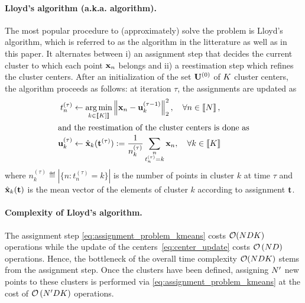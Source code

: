 \paragraph{Lloyd's algorithm (a.k.a. \kmeans algorithm).} The most popular procedure to (approximately) 
solve the \kmeans problem is Lloyd's algorithm, which is referred to as the \kmeans algorithm in the litterature as well as in this paper.
It alternates between
i) an assignment step that decides the current cluster to which each point ${\mathbf{x}}_n$
belongs and ii) a reestimation step which refines the cluster centers.
After an initialization of the set ${\mathbf{U}}^{(0)}$ of $K$
 cluster centers, the algorithm proceeds as follows: at iteration $\tau$,
  the assignments are updated as
\begin{align}
\label{eq:assignment_problem_kmeans}
 t_n^{(\tau)} &\leftarrow \operatorname*{arg\,min}_{k \in \left \llbracket K]\right \rrbracket} \left\|{\mathbf{x}}_{n} - {\mathbf{u}}_{k}^{(\tau-1)}\right\|_2^2,\quad \forall n\in\left \llbracket N\right \rrbracket,\\
\intertext{and the reestimation of the cluster centers is done as}
\label{eq:center_update}
{\mathbf{u}}^{(\tau)}_k &\leftarrow \hat{{\mathbf{x}}}_k({\mathbf{t}}^{(\tau)}) := \frac{1}{n_k^{(\tau)}} \sum_{\substack{n\\t^{(\tau)}_n= k}} {{\mathbf{x}}_{n}},\quad \forall k\in\left \llbracket K\right \rrbracket 
\end{align}
where $n_k^{(\tau)}\eqdef |\{n: t^{(\tau)}_n=k\}|$ is the number of points in cluster $k$
at time $\tau$ and $\hat{{\mathbf{x}}}_k({\mathbf{t}})$ is the mean vector of the elements of cluster $k$ according to assignment ${\mathbf{t}}$. 

\paragraph{Complexity of Lloyd's algorithm.} The assignment step \eqref{eq:assignment_problem_kmeans} costs $\mathcal{O}(NDK)$ operations while the update of the centers~\eqref{eq:center_update} costs $\mathcal{O}\left (ND\right )$ operations. Hence, the bottleneck of the overall time complexity $\mathcal{O}(NDK)$ stems from the assignment step. Once the clusters have been defined, assigning $N'$ new points to these clusters is performed via \eqref{eq:assignment_problem_kmeans} at the cost of $\mathcal{O}\left (N'DK \right )$ operations.

